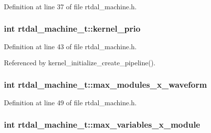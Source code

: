Definition at line 37 of file rtdal\-\_\-machine.\-h.

\hypertarget{structrtdal__machine__t_a6f33ae90fd88cb0bb88b41269f7836f1}{
\subsubsection[{kernel\-\_\-prio}]{\setlength{\rightskip}{0pt plus 5cm}int rtdal\-\_\-machine\-\_\-t\-::kernel\-\_\-prio}}\label{structrtdal__machine__t_a6f33ae90fd88cb0bb88b41269f7836f1}


Definition at line 43 of file rtdal\-\_\-machine.\-h.



Referenced by kernel\-\_\-initialize\-\_\-create\-\_\-pipeline().

\hypertarget{structrtdal__machine__t_aafd6d2ebe38ab2ee2cfd797f5b04d803}{
\subsubsection[{max\-\_\-modules\-\_\-x\-\_\-waveform}]{\setlength{\rightskip}{0pt plus 5cm}int rtdal\-\_\-machine\-\_\-t\-::max\-\_\-modules\-\_\-x\-\_\-waveform}}\label{structrtdal__machine__t_aafd6d2ebe38ab2ee2cfd797f5b04d803}


Definition at line 49 of file rtdal\-\_\-machine.\-h.

\hypertarget{structrtdal__machine__t_a98e1bf5ec3f8f2ad275f6783a8ee4df0}{
\subsubsection[{max\-\_\-variables\-\_\-x\-\_\-module}]{\setlength{\rightskip}{0pt plus 5cm}int rtdal\-\_\-machine\-\_\-t\-::max\-\_\-variables\-\_\-x\-\_\-module}}\label{structrtdal__machine__t_a98e1bf5ec3f8f2ad275f6783a8ee4df0}


